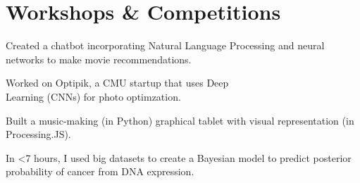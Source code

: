 \documentclass[]{deedy-resume-openfont}
\begin{document}
\section{\color{Blue} Workshops \& Competitions}
\begin{minipage}{0.5\textwidth} 



Created a chatbot incorporating Natural Language Processing and neural networks to make movie recommendations.
\sectionsep

Worked on Optipik, a CMU startup that uses Deep\\ Learning (CNNs) for photo optimzation.
\sectionsep




\end{minipage}%
\begin{minipage}{0.5\textwidth}

Built a music-making (in Python) graphical tablet with visual representation (in Processing.JS).
\sectionsep

In <7 hours, I used big datasets to create a Bayesian model to predict posterior probability of cancer from DNA expression.
\sectionsep


\end{minipage}



\end{document}
